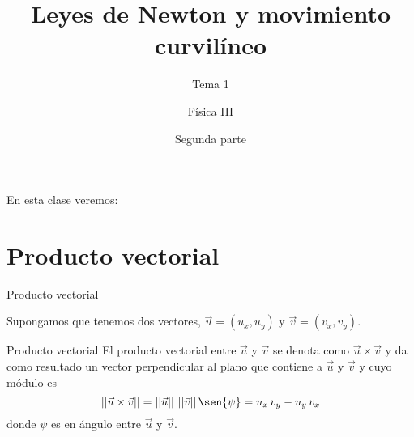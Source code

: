 \documentclass[11pt,handout,aspectratio=1610]{beamer}
\title{Leyes de Newton y movimiento curvilíneo}
\subtitle{Tema 1}
\author{Física III}
\institute{Instituto de Tecnología e Ingeniería \\ \vspace{0.25cm} Universidad Nacional de Hurlingham}
\date{Segunda parte}
\newcommand{\norm}[1]{\left\vert\left\vert #1 \right\vert\right\vert}
\newcommand{\vs}{\vspace{11pt}}
\begin{document}
\frame{\titlepage}

\begin{frame}{En esta clase veremos:}
    \tableofcontents
\end{frame}

\section{Producto vectorial}

\begin{frame}{Producto vectorial}

Supongamos que tenemos dos vectores, $\vec{u} = (u_x,u_y)$ y $\vec{v} = (v_x,v_y)$.

\vs

\begin{block}{Producto vectorial}
    El producto vectorial entre $\vec{u}$ y $\vec{v}$ se denota como $\vec{u} \times \vec{v}$ y da como resultado un vector perpendicular al plano que contiene a $\vec{u}$ y $\vec{v}$ y cuyo módulo es $$ \norm{\vec{u} \times \vec{v}} = \norm{\vec{u}} \, \norm{\vec{v}} \sen{\psi} = u_x \, v_y - u_y \, v_x$$ donde $\psi$ es en ángulo entre $\vec{u}$ y $\vec{v}$.
\end{block}

    
\end{frame}
\end{document}

